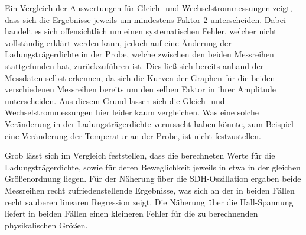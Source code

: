 


Ein Vergleich der Auswertungen für Gleich- und Wechselstrommessungen zeigt, dass sich die Ergebnisse jeweils um mindestens Faktor 2 unterscheiden. Dabei handelt es sich offensichtlich um einen systematischen Fehler, welcher nicht vollständig erklärt werden kann, jedoch auf eine Änderung der Ladungsträgerdichte in der Probe, welche zwischen den beiden Messreihen stattgefunden hat, zurückzuführen ist. Dies ließ sich bereits anhand der Messdaten selbst erkennen, da sich die Kurven der Graphen für die beiden verschiedenen Messreihen bereits um den selben Faktor in ihrer Amplitude unterscheiden. 
Aus diesem Grund lassen sich die Gleich- und Wechselstrommessungen hier leider kaum vergleichen. Was eine solche Veränderung in der Ladungsträgerdichte verursacht haben könnte, zum Beispiel eine Veränderung der Temperatur an der Probe, ist nicht festzustellen.

Grob lässt sich im Vergleich feststellen, dass die berechneten Werte für die Ladungsträgerdichte, sowie für deren Beweglichkeit jeweils in etwa in der gleichen Größenordnung liegen. Für der Näherung über die SDH-Oszillation ergaben beide Messreihen recht zufriedenstellende Ergebnisse, was sich an der in beiden Fällen recht sauberen linearen Regression zeigt. Die Näherung über die Hall-Spannung liefert in beiden Fällen einen kleineren Fehler für die zu berechnenden physikalischen Größen. 



